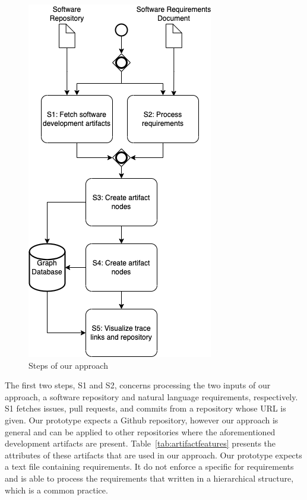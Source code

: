 \begin{figure}[htb]
    \centering
    \includegraphics[width=0.65\linewidth]{figs/approach.png}
    \caption{Steps of our approach}
    \label{fig:sys-flow}
  \end{figure}

  The first two steps, \textsf{S1} and \textsf{S2}, concerns processing the two inputs of our approach, a software repository and natural language requirements, respectively. \textsf{S1} fetches issues, pull requests, and commits from a repository whose URL is given. Our prototype expects a Github repository, however our approach is general and can be applied to other repositories where the aforementioned development artifacts are present. Table~\ref{tab:artifactfeatures} presents the attributes of these artifacts that are used in our approach. Our prototype expects a text file containing requirements. It do not enforce a specific for requirements and is able to process the requirements that written in a hierarchical structure, which is a common practice.

